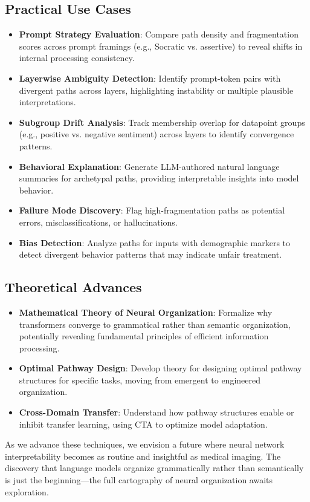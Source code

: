 \subsection{Practical Use Cases}

\begin{itemize}
    \item \textbf{Prompt Strategy Evaluation}: Compare path density and fragmentation scores across prompt framings (e.g., Socratic vs. assertive) to reveal shifts in internal processing consistency.
    
    \item \textbf{Layerwise Ambiguity Detection}: Identify prompt-token pairs with divergent paths across layers, highlighting instability or multiple plausible interpretations.
    
    \item \textbf{Subgroup Drift Analysis}: Track membership overlap for datapoint groups (e.g., positive vs. negative sentiment) across layers to identify convergence patterns.
    
    \item \textbf{Behavioral Explanation}: Generate LLM-authored natural language summaries for archetypal paths, providing interpretable insights into model behavior.
    
    \item \textbf{Failure Mode Discovery}: Flag high-fragmentation paths as potential errors, misclassifications, or hallucinations.
    
    \item \textbf{Bias Detection}: Analyze paths for inputs with demographic markers to detect divergent behavior patterns that may indicate unfair treatment.
\end{itemize}

\subsection{Theoretical Advances}

\begin{itemize}
    \item \textbf{Mathematical Theory of Neural Organization}: Formalize why transformers converge to grammatical rather than semantic organization, potentially revealing fundamental principles of efficient information processing.
    
    \item \textbf{Optimal Pathway Design}: Develop theory for designing optimal pathway structures for specific tasks, moving from emergent to engineered organization.
    
    \item \textbf{Cross-Domain Transfer}: Understand how pathway structures enable or inhibit transfer learning, using CTA to optimize model adaptation.
\end{itemize}

As we advance these techniques, we envision a future where neural network interpretability becomes as routine and insightful as medical imaging. The discovery that language models organize grammatically rather than semantically is just the beginning—the full cartography of neural organization awaits exploration.
